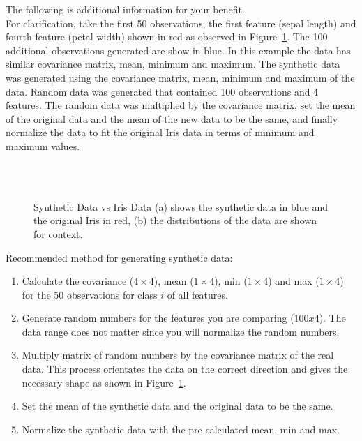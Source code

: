 \documentclass{article}
\begin{document}
\begin{enumerate}
The following is additional information for your benefit.\\

For clarification, take the first 50 observations, the first feature (sepal length) and fourth feature (petal width) shown in red as observed in Figure~\ref{fig:synthetic_data}. The 100 additional observations generated are show in blue. In this example the data has similar covariance matrix, mean, minimum and maximum. The synthetic data was generated using the covariance matrix, mean, minimum and maximum of the data. Random data was generated that contained 100 observations and 4 features. The random data was multiplied by the covariance matrix, set the mean of the original data and the mean of the new data to be the same, and finally normalize the data to fit the original Iris data in terms of minimum and maximum values. \\
    
\begin{figure}[htbp]
	\begin{center}
    		\\
    		\hspace{0.3pc}
    		\\
    		\caption{Synthetic Data vs Iris Data (a) shows the synthetic data in blue and the original Iris in red, (b) the distributions of the data are shown for context.}
    		\label{fig:synthetic_data}
	\end{center}
\end{figure}

Recommended method for generating synthetic data:

\begin{enumerate}
	\item Calculate the covariance ($4 \times 4$), mean ($1 \times 4$), min ($1 \times 4$) and max ($1 \times 4$) for the 50 observations for class $i$ of all features.
	\item Generate random numbers for the features you are comparing ($100 x 4$). The data range does not matter since you will normalize the random numbers.
	\item Multiply matrix of random numbers by the covariance matrix of the real data. This process orientates the data on the correct direction and gives the necessary shape as shown in Figure~\ref{fig:synthetic_data}.
	\item Set the mean of the synthetic data and the original data to be the same. 
	\item Normalize the synthetic data with the pre calculated mean, min and max.
\end{enumerate}


\end{enumerate}
\end{document}

